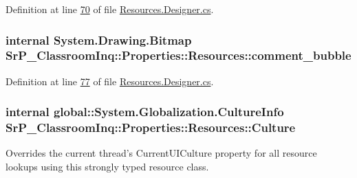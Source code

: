 \-Definition at line \hyperlink{_resources_8_designer_8cs_source_l00070}{70} of file \hyperlink{_resources_8_designer_8cs_source}{\-Resources.\-Designer.\-cs}.

\hypertarget{class_sr_p___classroom_inq_1_1_properties_1_1_resources_a2ca7de7a89e9cc488bc2e7ca92f49c94}{
\subsubsection[{comment\-\_\-bubble}]{\setlength{\rightskip}{0pt plus 5cm}internal \-System.\-Drawing.\-Bitmap \-Sr\-P\-\_\-\-Classroom\-Inq\-::\-Properties\-::\-Resources\-::comment\-\_\-bubble}}
\label{class_sr_p___classroom_inq_1_1_properties_1_1_resources_a2ca7de7a89e9cc488bc2e7ca92f49c94}


\-Definition at line \hyperlink{_resources_8_designer_8cs_source_l00077}{77} of file \hyperlink{_resources_8_designer_8cs_source}{\-Resources.\-Designer.\-cs}.

\hypertarget{class_sr_p___classroom_inq_1_1_properties_1_1_resources_a1788010aa2d65a3c3244ec2f6ccd20ed}{
\subsubsection[{\-Culture}]{\setlength{\rightskip}{0pt plus 5cm}internal global\-::\-System.\-Globalization.\-Culture\-Info \-Sr\-P\-\_\-\-Classroom\-Inq\-::\-Properties\-::\-Resources\-::\-Culture}}
\label{class_sr_p___classroom_inq_1_1_properties_1_1_resources_a1788010aa2d65a3c3244ec2f6ccd20ed}


\-Overrides the current thread's \-Current\-U\-I\-Culture property for all resource lookups using this strongly typed resource class. 



